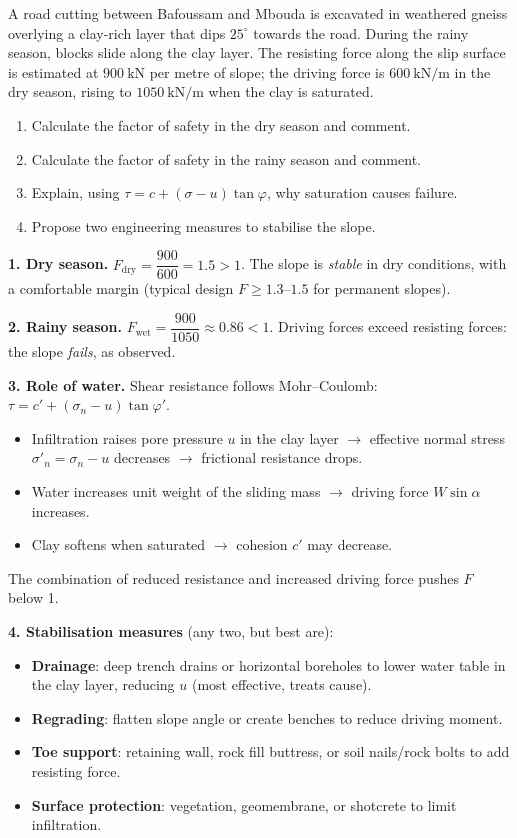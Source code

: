 \documentclass[11pt]{article}
\begin{document}
\begin{exoresolu}
A road cutting between Bafoussam and Mbouda is excavated in weathered gneiss overlying a clay-rich layer that dips $25^\circ$ towards the road. During the rainy season, blocks slide along the clay layer. The resisting force along the slip surface is estimated at $900\ \mathrm{kN}$ per metre of slope; the driving force is $600\ \mathrm{kN/m}$ in the dry season, rising to $1050\ \mathrm{kN/m}$ when the clay is saturated.
\begin{enumerate}
\item Calculate the factor of safety in the dry season and comment.
\item Calculate the factor of safety in the rainy season and comment.
\item Explain, using $\tau = c + (\sigma - u)\tan\varphi$, why saturation causes failure.
\item Propose two engineering measures to stabilise the slope.
\end{enumerate}
\tcblower
\textbf{1. Dry season.}
$F_{\text{dry}} = \dfrac{900}{600} = 1.5 > 1$.
The slope is \emph{stable} in dry conditions, with a comfortable margin (typical design $F \ge 1.3$--$1.5$ for permanent slopes).

\textbf{2. Rainy season.}
$F_{\text{wet}} = \dfrac{900}{1050} \approx 0.86 < 1$.
Driving forces exceed resisting forces: the slope \emph{fails}, as observed.

\textbf{3. Role of water.} Shear resistance follows Mohr--Coulomb: $\tau = c' + (\sigma_n - u)\tan\varphi'$.
\begin{itemize}
\item Infiltration raises pore pressure $u$ in the clay layer $\rightarrow$ effective normal stress $\sigma'_n = \sigma_n - u$ decreases $\rightarrow$ frictional resistance drops.
\item Water increases unit weight of the sliding mass $\rightarrow$ driving force $W \sin \alpha$ increases.
\item Clay softens when saturated $\rightarrow$ cohesion $c'$ may decrease.
\end{itemize}
The combination of reduced resistance and increased driving force pushes $F$ below 1.

\textbf{4. Stabilisation measures} (any two, but best are):
\begin{itemize}
\item \textbf{Drainage}: deep trench drains or horizontal boreholes to lower water table in the clay layer, reducing $u$ (most effective, treats cause).
\item \textbf{Regrading}: flatten slope angle or create benches to reduce driving moment.
\item \textbf{Toe support}: retaining wall, rock fill buttress, or soil nails/rock bolts to add resisting force.
\item \textbf{Surface protection}: vegetation, geomembrane, or shotcrete to limit infiltration.
\end{itemize}
\end{exoresolu}
\end{document}
